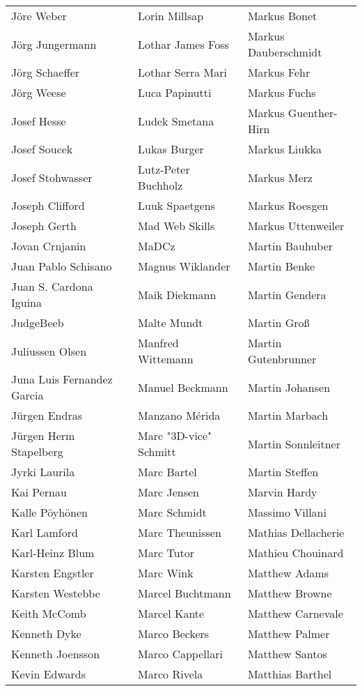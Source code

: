 \begin{small}
\begin{tabular}{p{4cm}p{4cm}p{4cm}}
Jöre Weber & Lorin Millsap & Markus Bonet \\
Jörg Jungermann & Lothar James Foss & Markus Dauberschmidt \\
Jörg Schaeffer & Lothar Serra Mari & Markus Fehr \\
Jörg Weese & Luca Papinutti & Markus Fuchs \\
Josef Hesse & Ludek Smetana & Markus Guenther-Hirn \\
Josef Soucek & Lukas Burger & Markus Liukka \\
Josef Stohwasser & Lutz-Peter Buchholz & Markus Merz \\
Joseph Clifford & Luuk Spaetgens & Markus Roesgen \\
Joseph Gerth & Mad Web Skills & Markus Uttenweiler \\
Jovan Crnjanin & MaDCz & Martin Bauhuber \\
Juan Pablo Schisano & Magnus Wiklander & Martin Benke \\
Juan S. Cardona Iguina & Maik Diekmann & Martin Gendera \\
JudgeBeeb & Malte Mundt & Martin Groß \\
Juliussen Olsen & Manfred Wittemann & Martin Gutenbrunner \\
Juna Luis Fernandez Garcia & Manuel Beckmann & Martin Johansen \\
Jürgen Endras & Manzano Mérida & Martin Marbach \\
Jürgen Herm Stapelberg & Marc "3D-vice" Schmitt & Martin Sonnleitner \\
Jyrki Laurila & Marc Bartel & Martin Steffen \\
Kai Pernau & Marc Jensen & Marvin Hardy \\
Kalle Pöyhönen & Marc Schmidt & Massimo Villani \\
Karl Lamford & Marc Theunissen & Mathias Dellacherie \\
Karl-Heinz Blum & Marc Tutor & Mathieu Chouinard \\
Karsten Engstler & Marc Wink & Matthew Adams \\
Karsten Westebbe & Marcel Buchtmann & Matthew Browne \\
Keith McComb & Marcel Kante & Matthew Carnevale \\
Kenneth Dyke & Marco Beckers & Matthew Palmer \\
Kenneth Joensson & Marco Cappellari & Matthew Santos \\
Kevin Edwards & Marco Rivela & Matthias Barthel \\

\end{tabular}
\end{small}

